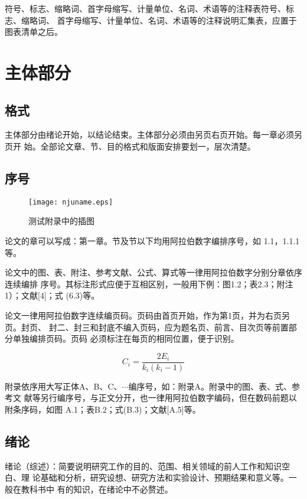 \documentclass[master]{njuthesis}
\begin{document}
符号、标志、缩略词、首字母缩写、计量单位、名词、术语等的注释表符号、标志、缩略词、
首字母缩写、计量单位、名词、术语等的注释说明汇集表，应置于图表清单之后。

\section{主体部分}

\subsection{格式}

主体部分由绪论开始，以结论结束。主体部分必须由另页右页开始。每一章必须另页开
始。全部论文章、节、目的格式和版面安排要划一，层次清楚。

\subsection{序号}

\begin{figure}[htbp]
  \centering
  \texttt{[image: njuname.eps]}\\
  \caption{测试附录中的插图}\label{fig:appendix1}
\end{figure}

论文的章可以写成：第一章。节及节以下均用阿拉伯数字编排序号，如
1.1，1.1.1等。

论文中的图、表、附注、参考文献、公式、算式等一律用阿拉伯数字分别分章依序连续编排
序号。其标注形式应便于互相区别，一般用下例：图1.2；表2.3；附注1）；文献[4]；式
  (6.3)等。

论文一律用阿拉伯数字连续编页码。页码由首页开始，作为第1页，并为右页另页。封页、
封二、封三和封底不编入页码，应为题名页、前言、目次页等前置部分单独编排页码。页码
必须标注在每页的相同位置，便于识别。

\begin{equation}
    C_i = \frac{2E_i}{k_i(k_i-1)}
\end{equation}

附录依序用大写正体A、B、C、$\cdots$编序号，如：附录A。附录中的图、表、式、参考文
献等另行编序号，与正文分开，也一律用阿拉伯数字编码，但在数码前题以附条序码，如图
A.1；表B.2；式(B.3)；文献[A.5]等。

\subsection{绪论}

绪论（综述）：简要说明研究工作的目的、范围、相关领域的前人工作和知识空白、理
论基础和分析，研究设想、研究方法和实验设计、预期结果和意义等。一般在教科书中
有的知识，在绪论中不必赘述。
\end{document}

